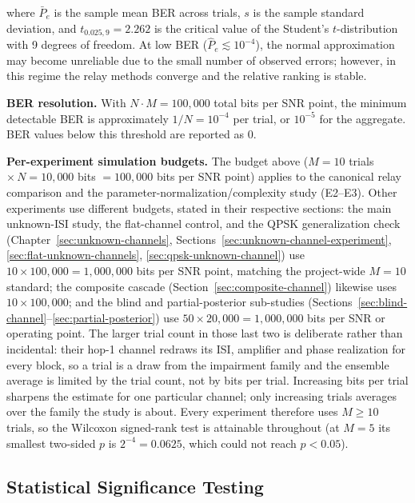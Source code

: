 where \(\bar{P}_e\) is the sample mean BER across trials, \(s\) is the sample standard deviation, and \(t_{0.025, 9} = 2.262\) is the critical value of the Student's \(t\)-distribution with 9 degrees of freedom. At low BER (\(\hat{P}_e \lesssim 10^{-4}\)), the normal approximation may become unreliable due to the small number of observed errors; however, in this regime the relay methods converge and the relative ranking is stable.

\textbf{BER resolution.} With \(N \cdot M = 100{,}000\) total bits per SNR point, the minimum detectable BER is approximately \(1/N = 10^{-4}\) per trial, or \(10^{-5}\) for the aggregate. BER values below this threshold are reported as 0.

\textbf{Per-experiment simulation budgets.} The budget above ($M=10$ trials $\times\,N=10{,}000$ bits $=100{,}000$ bits per SNR point) applies to the canonical relay comparison and the parameter-normalization/complexity study (E2--E3). Other experiments use different budgets, stated in their respective sections: the main unknown-ISI study, the flat-channel control, and the QPSK generalization check (Chapter~\ref{sec:unknown-channels}, Sections~\ref{sec:unknown-channel-experiment}, \ref{sec:flat-unknown-channels}, \ref{sec:qpsk-unknown-channel}) use $10\times100{,}000=1{,}000{,}000$ bits per SNR point, matching the project-wide $M=10$ standard; the composite cascade (Section~\ref{sec:composite-channel}) likewise uses $10\times100{,}000$; and the blind and partial-posterior sub-studies (Sections~\ref{sec:blind-channel}--\ref{sec:partial-posterior}) use $50\times20{,}000=1{,}000{,}000$ bits per SNR or operating point. The larger trial count in those last two is deliberate rather than incidental: their hop-1 channel redraws its ISI, amplifier and phase realization for every block, so a trial is a draw from the impairment family and the ensemble average is limited by the trial count, not by bits per trial. Increasing bits per trial sharpens the estimate for one particular channel; only increasing trials averages over the family the study is about. Every experiment therefore uses $M\geq10$ trials, so the Wilcoxon signed-rank test is attainable throughout (at $M=5$ its smallest two-sided $p$ is $2^{-4}=0.0625$, which could not reach $p<0.05$).

\subsection{Statistical Significance Testing}\label{sec:statistical-significance-testing}

